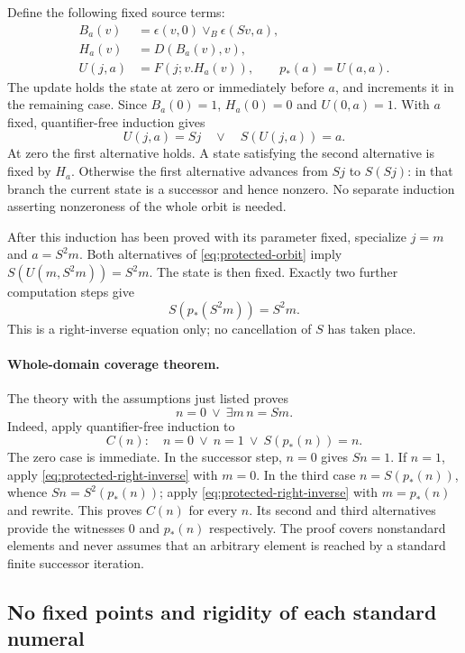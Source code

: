 \documentclass[11pt]{article}
\theoremstyle{definition}\newtheorem{definition}[theorem]{Definition}
\begin{document}
Define the following fixed source terms:
\[
 \begin{split}
 B_a(v)&=\epsilon(v,0)\vee_B\epsilon(Sv,a),\\
 H_a(v)&=D(B_a(v),v),\\
 U(j,a)&=F(j;v.H_a(v)),\qquad p_*(a)=U(a,a).
 \end{split}
\]
The update holds the state at zero or immediately before $a$, and
increments it in the remaining case. Since $B_a(0)=1$,
$H_a(0)=0$ and $U(0,a)=1$. With $a$ fixed, quantifier-free induction gives
\begin{equation}
 U(j,a)=Sj\quad\lor\quad S(U(j,a))=a.
 \label{eq:protected-orbit}
\end{equation}
At zero the first alternative holds. A state satisfying the second
alternative is fixed by $H_a$. Otherwise the first alternative advances
from $Sj$ to $S(Sj)$: in that branch the current state is a successor
and hence nonzero. No separate induction asserting nonzeroness of the
whole orbit is needed.

After this induction has been proved with its parameter fixed,
specialize $j=m$ and $a=S^2m$. Both alternatives of
\eqref{eq:protected-orbit} imply $S(U(m,S^2m))=S^2m$. The state is
then fixed. Exactly two further computation steps give
\begin{equation}
                     S(p_*(S^2m))=S^2m.
 \label{eq:protected-right-inverse}
\end{equation}
This is a right-inverse equation only; no cancellation of $S$ has
taken place.

\paragraph{Whole-domain coverage theorem.}
The theory with the assumptions just listed proves
\[
                     n=0\ \lor\ \exists m\,n=Sm.
\]
Indeed, apply quantifier-free induction to
\[
 C(n):\quad n=0\ \lor\ n=1\ \lor\ S(p_*(n))=n.
\]
The zero case is immediate. In the successor step, $n=0$ gives
$Sn=1$. If $n=1$, apply \eqref{eq:protected-right-inverse} with
$m=0$. In the third case $n=S(p_*(n))$, whence
$Sn=S^2(p_*(n))$; apply \eqref{eq:protected-right-inverse} with
$m=p_*(n)$ and rewrite. This proves $C(n)$ for every $n$.
Its second and third alternatives provide the witnesses $0$ and
$p_*(n)$ respectively. The proof covers nonstandard elements and
never assumes that an arbitrary element is reached by a standard
finite successor iteration.

\subsection{No fixed points and rigidity of each standard numeral}
\end{document}
